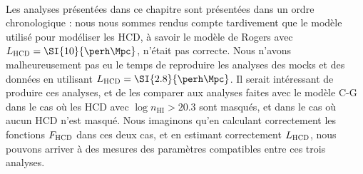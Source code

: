 \paragraph{}
Les analyses présentées dans ce chapitre sont présentées dans un ordre chronologique : nous nous sommes rendus compte tardivement que le modèle utilisé pour modéliser les HCD, à savoir le modèle de Rogers avec $L_{\textsc{HCD}} = \SI{10}{\perh\Mpc}$, n'était pas correcte.
Nous n'avons malheureusement pas eu le temps de reproduire les analyses des mocks et des données en utilisant $L_{\textsc{HCD}} = \SI{2.8}{\perh\Mpc}$.
Il serait intéressant de produire ces analyses, et de les comparer aux analyses faites avec le modèle C-G dans le cas où les HCD avec $\log n_{\mathrm{HI}} > \num{20.3}$ sont masqués, et dans le cas où aucun HCD n'est masqué.
Nous imaginons qu'en calculant correctement les fonctions $F_{\textsc{HCD}}$ dans ces deux cas, et en estimant correctement $L_{\textsc{HCD}}$, nous pouvons arriver à des mesures des paramètres \lya{} compatibles entre ces trois analyses.




